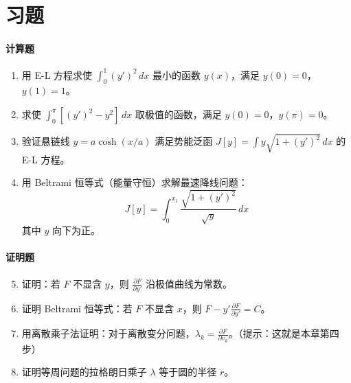\section{习题}

\paragraph{计算题}
\begin{enumerate}
    \item 用 E-L 方程求使 $\int_0^1 (y')^2 \, dx$ 最小的函数 $y(x)$，满足 $y(0) = 0$，$y(1) = 1$。
    
    \item 求使 $\int_0^{\pi} [(y')^2 - y^2] \, dx$ 取极值的函数，满足 $y(0) = 0$，$y(\pi) = 0$。
    
    \item 验证悬链线 $y = a\cosh(x/a)$ 满足势能泛函 $J[y] = \int y\sqrt{1+(y')^2} \, dx$ 的 E-L 方程。
    
    \item 用 Beltrami 恒等式（能量守恒）求解最速降线问题：
    \[
    J[y] = \int_0^{x_1} \frac{\sqrt{1+(y')^2}}{\sqrt{y}} \, dx
    \]
    其中 $y$ 向下为正。
\end{enumerate}

\paragraph{证明题}
\begin{enumerate}
    \setcounter{enumi}{4}
    \item 证明：若 $F$ 不显含 $y$，则 $\frac{\partial F}{\partial y'}$ 沿极值曲线为常数。
    
    \item 证明 Beltrami 恒等式：若 $F$ 不显含 $x$，则 $F - y'\frac{\partial F}{\partial y'} = C$。
    
    \item 用离散乘子法证明：对于离散变分问题，$\lambda_k = \frac{\partial F}{\partial v_k}$。（提示：这就是本章第四步）
    
    \item 证明等周问题的拉格朗日乘子 $\lambda$ 等于圆的半径 $r$。
\end{enumerate}

